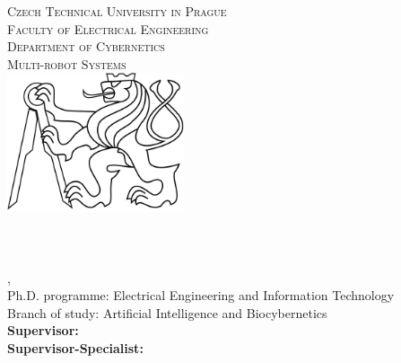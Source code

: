 \begin{titlepage}
  \begin{center}

    \textsc{\Large Czech Technical University in Prague}\\[1em]
    \textsc{\large Faculty of Electrical Engineering\\
    Department of Cybernetics\\
    Multi-robot Systems\\[3em]
    }
    \includegraphics[height=4.1cm]{fig/lev.pdf}\\[3em]

    \textbf{\textsc{\Huge \Title}}\\[2em]

    \textbf{\Large \DocName}\\[6em]

    \textbf{\huge \Author}\\[6em]

    {\large \Location, \Date}\\[3em]

    Ph.D. programme: Electrical Engineering and Information Technology\\
    Branch of study: Artificial Intelligence and Biocybernetics\\[2em]

    \textbf{Supervisor: \Supervisor}\\
    \textbf{Supervisor-Specialist: \SupervisorSpecialist}

    \vspace{2pt}

  \end{center}
\end{titlepage}
